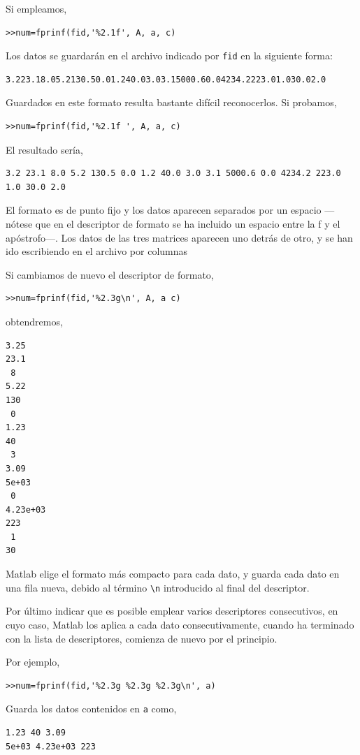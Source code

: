 Si empleamos,
\begin{verbatim}
>>num=fprinf(fid,'%2.1f', A, a, c)
\end{verbatim}

Los datos se guardarán en el archivo indicado por \texttt{fid} en la siguiente forma:
\begin{verbatim}
3.223.18.05.2130.50.01.240.03.03.15000.60.04234.2223.01.030.02.0
\end{verbatim}

Guardados en este formato resulta bastante difícil reconocerlos. Si probamos,
\begin{verbatim}
>>num=fprinf(fid,'%2.1f ', A, a, c)
\end{verbatim}

El resultado sería,
\begin{verbatim}
3.2 23.1 8.0 5.2 130.5 0.0 1.2 40.0 3.0 3.1 5000.6 0.0 4234.2 223.0 1.0 30.0 2.0
\end{verbatim}

El formato es de punto fijo y los datos aparecen separados por un espacio ---nótese que en el descriptor de formato se ha incluido un espacio entre la f y el apóstrofo---. Los datos de las tres matrices aparecen uno detrás de otro, y se han ido escribiendo en el archivo por columnas

Si cambiamos de nuevo el descriptor de formato,
\begin{verbatim}
>>num=fprinf(fid,'%2.3g\n', A, a c)
\end{verbatim}
obtendremos,
\begin{verbatim}
3.25
23.1
 8
5.22
130
 0
1.23
40
 3
3.09
5e+03
 0
4.23e+03
223
 1
30
\end{verbatim}
Matlab elige el formato más compacto para cada dato, y guarda cada dato en una fila nueva, debido al término \texttt{\textbackslash n} introducido al final del descriptor.

Por último indicar que es posible emplear varios descriptores consecutivos, en cuyo caso, Matlab los aplica a cada dato consecutivamente, cuando ha terminado con la lista de descriptores, comienza de nuevo por el principio.

Por ejemplo, 

\begin{verbatim}
>>num=fprinf(fid,'%2.3g %2.3g %2.3g\n', a)
\end{verbatim}
Guarda los datos contenidos en \texttt{a} como,
\begin{verbatim}
1.23 40 3.09
5e+03 4.23e+03 223
\end{verbatim}

